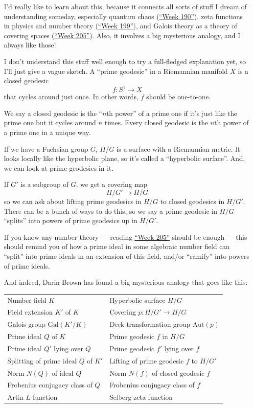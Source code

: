 \documentclass{article}
\begin{document}
I'd really like to learn about this, because it connects all sorts of
stuff I dream of understanding someday, especially quantum chaos
(\protect\hyperlink{week190}{``Week 190''}), zeta functions in physics
and number theory (\protect\hyperlink{week199}{``Week 199''}), and
Galois theory as a theory of covering spaces
(\protect\hyperlink{week205}{``Week 205''}). Also, it involves a big
mysterious analogy, and I always like those!

I don't understand this stuff well enough to try a full-fledged
explanation yet, so I'll just give a vague sketch. A ``prime geodesic''
in a Riemannian manifold \(X\) is a closed geodesic
\[f\colon S^1 \to X\] that cycles around just once. In other words,
\(f\) should be one-to-one.

We say a closed geodesic is the ``\(n\)th power'' of a prime one if it's
just like the prime one but it cycles around \(n\) times. Every closed
geodesic is the \(n\)th power of a prime one in a unique way.

If we have a Fuchsian group \(G\), \(H/G\) is a surface with a
Riemannian metric. It looks locally like the hyperbolic plane, so it's
called a ``hyperbolic surface''. And, we can look at prime geodesics in
it.

If \(G'\) is a subgroup of \(G\), we get a covering map \[H/G' \to H/G\]
so we can ask about lifting prime geodesics in \(H/G\) to closed
geodesics in \(H/G'\). There can be a bunch of ways to do this, so we
say a prime geodesic in \(H/G\) ``splits'' into powers of prime
geodesics up in \(H/G'\).

If you know any number theory --- reading
\protect\hyperlink{week205}{``Week 205''} should be enough --- this
should remind you of how a prime ideal in some algebraic number field
can ``split'' into prime ideals in an extension of this field, and/or
``ramify'' into powers of prime ideals.

And indeed, Darin Brown has found a big mysterious analogy that goes
like this:

\begin{longtable}[]{@{}ll@{}}
\toprule
\endhead
Number field \(K\) & Hyperbolic surface \(H/G\)\tabularnewline
Field extension \(K'\) of \(K\) & Covering
\(p\colon H/G' \to H/G\)\tabularnewline
Galois group \(\mathrm{Gal}(K'/K)\) & Deck transformation group
\(\mathrm{Aut}(p)\)\tabularnewline
Prime ideal \(Q\) of \(K\) & Prime geodesic \(f\) in
\(H/G\)\tabularnewline
Prime ideal \(Q'\) lying over \(Q\) & Prime geodesic \(f'\) lying over
\(f\)\tabularnewline
Splitting of prime ideal \(Q\) of \(K'\) & Lifting of prime geodesic
\(f\) to \(H/G'\)\tabularnewline
Norm \(N(Q)\) of ideal \(Q\) & Norm \(N(f)\) of closed geodesic
\(f\)\tabularnewline
Frobenius conjugacy class of \(Q\) & Frobenius conjugacy class of
\(f\)\tabularnewline
Artin \(L\)-function & Selberg zeta function\tabularnewline
\bottomrule
\end{longtable}
\end{document}
